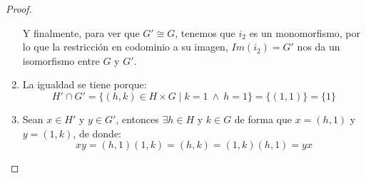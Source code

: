 \begin{prop}
\begin{proof}
\begin{enumerate}
                Y finalmente, para ver que $G'\cong G$, tenemos que $i_2$ es un monomorfismo, por lo que la restricción en codominio a su imagen, $Im(i_2) = G'$ nos da un isomorfismo entre $G$ y $G'$.
            \item La igualdad se tiene porque:
                \begin{equation*}
                    H'\cap G' = \{(h,k)\in H\times G \mid k = 1\ \land\ h = 1\} = \{(1,1)\} = \{1\}
                \end{equation*}
            \item Sean $x\in H'$ y $y\in G'$, entonces $\exists h\in H$ y $k\in G$ de forma que $x = (h,1)$ y $y = (1,k)$, de donde:
                \begin{equation*}
                    xy = (h,1)(1,k) = (h,k) = (1,k)(h,1) = yx
                \end{equation*}
        \end{enumerate}
    \end{proof}
\end{prop}


